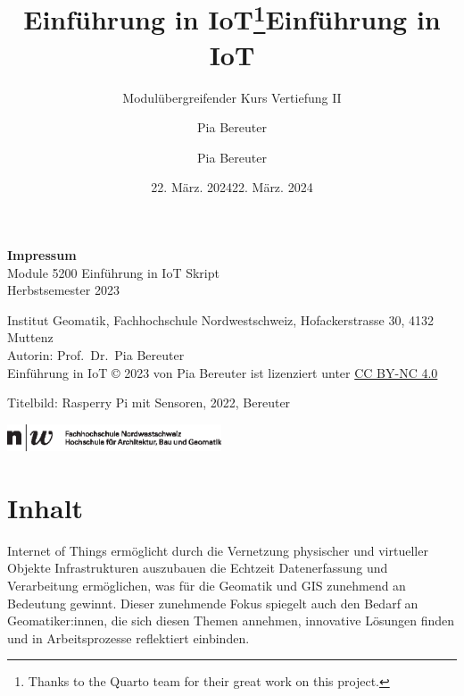 \documentclass[
  11pt,
  a4paper,
  oneside, openany  ,captions=tableheading
]{scrbook}
\title{Einführung in IoT\thanks{Thanks to the Quarto team for their
great work on this project.}}
\subtitle{Modulübergreifender Kurs Vertiefung II}
\author{Pia Bereuter}
\date{22. März. 2024}
\title{Einführung in IoT}
\author{Pia Bereuter}
\date{22. März. 2024}
\renewcommand*\contentsname{Inhaltsverzeichnis}
\newcommand\contentsname{Inhaltsverzeichnis}
\theoremstyle{remark}
\begin{document}
\clearpage
\thispagestyle{empty}
\makeatletter%
\makeatother%
\clearpage
\thispagestyle{empty}
\vspace*{\fill}
{\footnotesize 
\textbf{Impressum} \\
Module 5200 Einführung in IoT Skript\\
Herbstsemester 2023

Institut Geomatik, Fachhochschule Nordwestschweiz, Hofackerstrasse 30,
4132 Muttenz\\
Autorin: Prof.~Dr.~Pia Bereuter\\
Einführung in IoT © 2023 von Pia Bereuter ist lizenziert unter
\href{https://creativecommons.org/licenses/by-nc/4.0/}{CC BY-NC 4.0}

Titelbild: Rasperry Pi mit Sensoren, 2022, Bereuter

\includegraphics[height=8mm]{images/fhnw.eps}}
\clearpage

\frontmatter


\renewcommand*\contentsname{Inhaltsverzeichnis}
{
\hypersetup{linkcolor=}
\setcounter{tocdepth}{1}
\tableofcontents
}

%		


\mainmatter
{}

\chapter*{Inhalt}\label{inhalt}


Internet of Things ermöglicht durch die Vernetzung physischer und
virtueller Objekte Infrastrukturen auszubauen die Echtzeit
Datenerfassung und Verarbeitung ermöglichen, was für die Geomatik und
GIS zunehmend an Bedeutung gewinnt. Dieser zunehmende Fokus spiegelt
auch den Bedarf an Geomatiker:innen, die sich diesen Themen annehmen,
innovative Lösungen finden und in Arbeitsprozesse reflektiert einbinden.
\end{document}

